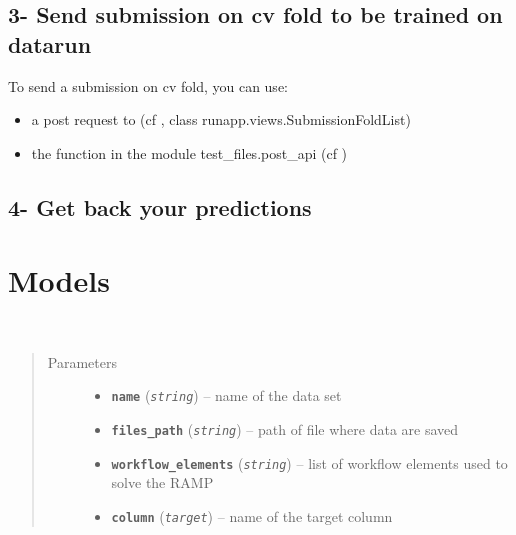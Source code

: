 \documentclass[letterpaper,10pt,english]{sphinxmanual}
\begin{document}
\section{3- Send submission on cv fold to be trained on datarun}
\label{modules/workflow:send-submission-on-cv-fold-to-be-trained-on-datarun}
To send a submission on cv fold, you can use:
\begin{itemize}
\item {} 
a post request to  (cf {\hyperref[modules/views:requestsdirect]{}}, class runapp.views.SubmissionFoldList)

\item {} 
the  function in the module test\_files.post\_api (cf {\hyperref[modules/views:requestsmodule]{}})

\end{itemize}


\section{4- Get back your predictions}
\label{modules/workflow:get-back-your-predictions}

\chapter{Models}
\label{modules/models:models}\label{modules/models:module-runapp.models}\label{modules/models::doc}

\begin{fulllineitems}
\label{modules/models:runapp.models.RawData}~\begin{quote}\begin{description}
\item[{Parameters}] \leavevmode\begin{itemize}
\item {} 
\textbf{\texttt{name}} (\emph{\texttt{string}}) -- name of the data set

\item {} 
\textbf{\texttt{files\_path}} (\emph{\texttt{string}}) -- path of file where data are saved

\item {} 
\textbf{\texttt{workflow\_elements}} (\emph{\texttt{string}}) -- list of workflow elements used to solve the RAMP

\item {} 
\textbf{\texttt{column}} (\emph{\texttt{target}}) -- name of the target column

\end{itemize}

\end{description}\end{quote}

\end{fulllineitems}
\end{document}
